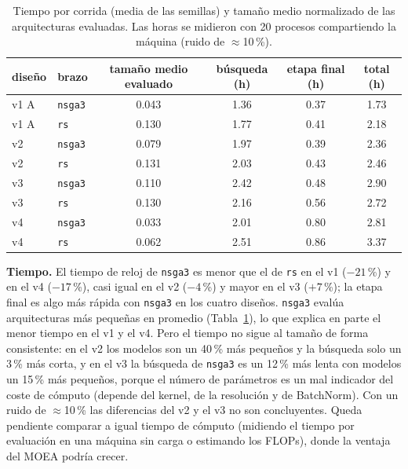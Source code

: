 \documentclass[11pt,a4paper]{article}
\begin{document}
\begin{table}[h]
\centering\footnotesize
\setlength{\tabcolsep}{4pt}
\begin{tabular}{llcccc}
\toprule
diseño & brazo & tamaño medio evaluado & búsqueda (h) & etapa final (h) & total (h)\\
\midrule
v1 A & \texttt{nsga3} & 0.043 & 1.36 & 0.37 & 1.73\\
v1 A & \texttt{rs} & 0.130 & 1.77 & 0.41 & 2.18\\
v2 & \texttt{nsga3} & 0.079 & 1.97 & 0.39 & 2.36\\
v2 & \texttt{rs} & 0.131 & 2.03 & 0.43 & 2.46\\
v3 & \texttt{nsga3} & 0.110 & 2.42 & 0.48 & 2.90\\
v3 & \texttt{rs} & 0.130 & 2.16 & 0.56 & 2.72\\
v4 & \texttt{nsga3} & 0.033 & 2.01 & 0.80 & 2.81\\
v4 & \texttt{rs} & 0.062 & 2.51 & 0.86 & 3.37\\
\bottomrule
\end{tabular}
\caption{Tiempo por corrida (media de las semillas) y tamaño medio normalizado de las arquitecturas evaluadas. Las horas se midieron con 20 procesos compartiendo la máquina (ruido de $\approx$10\,\%).}
\label{tab:tiempo}
\end{table}

\textbf{Tiempo.} El tiempo de reloj de \texttt{nsga3} es menor que el de \texttt{rs} en el v1 ($-21$\,\%) y en el v4 ($-17$\,\%), casi igual en el v2 ($-4$\,\%) y mayor en el v3 ($+7$\,\%); la etapa final es algo más rápida con \texttt{nsga3} en los cuatro diseños. \texttt{nsga3} evalúa arquitecturas más pequeñas en promedio (Tabla~\ref{tab:tiempo}), lo que explica en parte el menor tiempo en el v1 y el v4. Pero el tiempo no sigue al tamaño de forma consistente: en el v2 los modelos son un 40\,\% más pequeños y la búsqueda solo un 3\,\% más corta, y en el v3 la búsqueda de \texttt{nsga3} es un 12\,\% más lenta con modelos un 15\,\% más pequeños, porque el número de parámetros es un mal indicador del coste de cómputo (depende del kernel, de la resolución y de BatchNorm). Con un ruido de $\approx$10\,\% las diferencias del v2 y el v3 no son concluyentes. Queda pendiente comparar a igual tiempo de cómputo (midiendo el tiempo por evaluación en una máquina sin carga o estimando los FLOPs), donde la ventaja del MOEA podría crecer.
\end{document}
